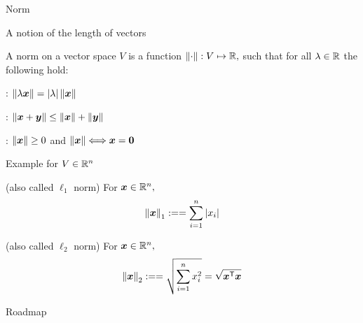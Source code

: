 \documentclass[handout,fleqn,aspectratio=169]{beamer}
\begin{document}
\begin{frame}{Norm}

\plitemsep 0.1in

\bci 
\item A notion of the length of vectors

\item {} A norm on a vector space $V$ is a function $\left \lVert \cdot \right \rVert: V \mapsto {\mathbb R},$ such that for all $\lambda \in {\mathbb R}$ the following hold:

\bci
\item {}: $\left \lVert \lambda \bm{x} \right \rVert = |\lambda| \left \lVert \bm{x} \right \rVert$
\item {}: $\left \lVert \bm{x} + \bm{y} \right \rVert \le \left \lVert \bm{x} \right \rVert + \left \lVert \bm{y} \right \rVert $
\item {}: $\left \lVert \bm{x} \right \rVert \ge 0$ and $\left \lVert \bm{x} \right \rVert \Longleftrightarrow \bm{x} = \bm{0}$
\eci
\eci
\end{frame}

\begin{frame}{Example for $V \in {\mathbb R}^n$}

\plitemsep 0.1in

\bci 
\item {} (also called $\ell_1$ norm) For $\bm{x} \in {\mathbb R}^n,$
$$
\left \lVert \bm{x} \right \rVert_1 := = \sum_{i=1}^n |x_i|
$$
\item {} (also called $\ell_2$ norm) For $\bm{x} \in {\mathbb R}^n,$
$$
\left \lVert \bm{x} \right \rVert_2 := = \sqrt{\sum_{i=1}^n x_i^2} = \sqrt{{\bm{x}}^{\mathsf{T}} \bm{x}}
$$

\eci
\end{frame}


\begin{frame}{Roadmap}

\plitemsep 0.1in

\bce[(1)] 
\item {}

\item {}

\item {}

\ece
\end{frame}
\end{document}
